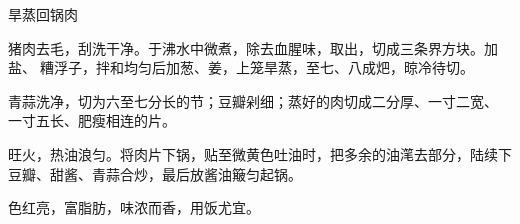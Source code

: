 %
%
%
%
%
%
%
\begin{recipe}{旱蒸回锅肉}

\ingredients


\preparation

\step 猪肉去毛，刮洗干净。于沸水中微煮，除去血腥味，取出，切成三条界方块。加
盐、𰪿糟浮子，拌和均匀后加葱、姜，上笼旱蒸，至七、八成𤆵，晾冷待切。

\step 青蒜洗净，切为六至七分长的节；豆瓣剁细；蒸好的肉切成二分厚、一寸二宽、
一寸五长、肥瘦相连的片。

\step 旺火，热油浪匀。将肉片下锅，贴至微黄色吐油时，把多余的油滗去部分，陆续下
豆瓣、甜酱、青蒜合炒，最后放酱油簸匀起锅。

\features

色红亮，富脂肪，味浓而香，用饭尤宜。

\end{recipe}

